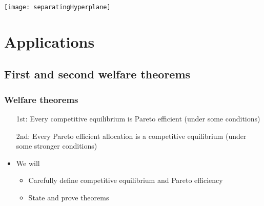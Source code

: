 \documentclass[compress]{beamer}
\begin{document}
\begin{frame}
  \begin{centering}
    \texttt{[image: separatingHyperplane]}
  \end{centering}
\end{frame}

\section{Applications}

\subsection{First and second welfare theorems}

\begin{frame}
  \frametitle{Welfare theorems}
  \begin{itemize}
  \item[1st:] Every competitive equilibrium is Pareto efficient (under
    some conditions)
  \item[2nd:] Every Pareto efficient allocation is a competitive
    equilibrium (under some stronger conditions)
  \item We will
    \begin{itemize}
    \item Carefully define competitive equilibrium and Pareto
      efficiency
    \item State and prove theorems
    \end{itemize}
  \end{itemize}
\end{frame}
\end{document}
